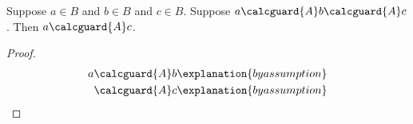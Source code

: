 

\begin{proposition}\label{calculation_missing_equality}
    Suppose $a\in B$ and $b\in B$ and $c\in B$.
    Suppose $a\calcguard{A}b\calcguard{A}c$.
    Then $a\calcguard{A}c$.
\end{proposition}
\begin{proof}
    \begin{align*}
        a &\calcguard{A}b \explanation{by assumption} \\
          &\calcguard{A}c \explanation{by assumption}
    \end{align*}
\end{proof}
